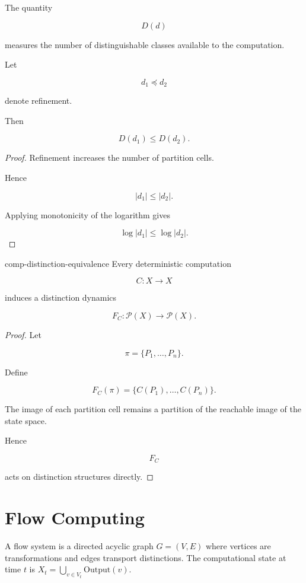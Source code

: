 \documentclass[12pt,twoside,openright]{book}
\newenvironment{prop}
{\begin{proposition}{}{}}
{\end{proposition}}
\begin{document}
The quantity

\[
D(d)
\]

measures the number of distinguishable classes available
to the computation.

\begin{prop}
Let

\[
d_1
\preceq
d_2
\]

denote refinement.

Then

\[
D(d_1)
\le
D(d_2).
\]
\end{prop}

\begin{proof}
Refinement increases the number of partition cells.

Hence

\[
|d_1|
\le
|d_2|.
\]

Applying monotonicity of the logarithm gives

\[
\log|d_1|
\le
\log|d_2|.
\]
\end{proof}

\begin{theorem}{comp-distinction-equivalence}
Every deterministic computation

\[
C:X\rightarrow X
\]

induces a distinction dynamics

\[
F_C:\mathcal P(X)\rightarrow\mathcal P(X).
\]
\end{theorem}

\begin{proof}
Let

\[
\pi
=
\{P_1,\ldots,P_n\}.
\]

Define

\[
F_C(\pi)
=
\{
C(P_1),
\ldots,
C(P_n)
\}.
\]

The image of each partition cell remains a partition of
the reachable image of the state space.

Hence

\[
F_C
\]

acts on distinction structures directly.
\end{proof}

\section{Flow Computing}

A flow system is a directed acyclic graph $G = (V,E)$
where vertices are transformations and edges transport
distinctions.
The computational state at time $t$ is
$X_t = \bigcup_{v \in V_t}\mathrm{Output}(v)$.
\end{document}
